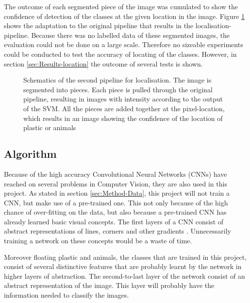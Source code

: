 The outcome of each segmented piece of the image was cumulated to show the confidence of detection of the classes at the given location in the image.
Figure \ref{fig:locpip} shows the adaptation to the original pipeline that results in the localisation-pipeline.
Because there was no labelled data of these segmented images, the evaluation could not be done on a large scale.
Therefore no sizeable experiments could be conducted to test the accuracy of locating of the classes.
However, in section \ref{sec:Results-location} the outcome of several tests is shown.

\begin{figure}%
\centering
\ifx\showfig\undefined

\fi
\caption{Schematics of the second pipeline for localisation. The image is segmented into pieces. Each piece is pulled through the original pipeline, resulting in images with intensity according to the output of the SVM. All the pieces are added together at the pixel-location, which results in an image showing the confidence of the location of plastic or animals}
\label{fig:locpip}
\end{figure}









\iffalse
\subsection{Algorithm}
\label{sec:Method-algotihm}
Because of the high accuracy Convolutional Neural Networks (CNNs) have reached on several problems in Computer Vision, they are also used in this project.
As stated in section \ref{sec:Method-Data}, this project will not train a CNN, but make use of a pre-trained one.
This not only because of the high chance of over-fitting on the data, but also because a pre-trained CNN has already learned basic visual concepts.
The first layers of a CNN consist of abstract representations of lines, corners and other gradients \citep{zeiler2014visualizing}.
Unnecessarily training a network on these concepts would be a waste of time.

Moreover floating plastic and animals, the classes that are trained in this project, consist of several distinctive features that are probably learnt by the network in higher layers of abstraction.
The second-to-last layer of the network consist of an abstract representation of the image.
This layer will probably have the information needed to classify the images. \citeneed

